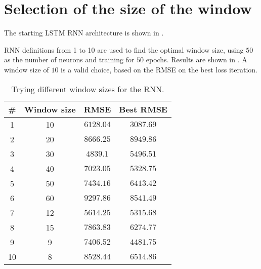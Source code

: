 \section{Selection of the size of the window}\label{sec:rnnwinsize}

The starting LSTM RNN architecture is shown in .



RNN definitions from 1 to 10 are used to find the optimal window size, using
\(50\) as the number of neurons and training for \(50\) epochs. Results are
shown in . A window size of \(10\) is a valid
choice, based on the RMSE on the best loss iteration.

\begin{table}[hbtp]
	\centering
	\begin{tabular}{|c|c|c|c|}
		\toprule
		\# & Window size & RMSE & Best RMSE \\
		\midrule
		1 & 10 & \(6128.04\) & \(3087.69\) \\
		2 & 20 & \(8666.25\) & \(8949.86\) \\
		3 & 30 & \(4839.1\) & \(5496.51\) \\
		4 & 40 & \(7023.05\) & \(5328.75\) \\
		5 & 50 & \(7434.16\) & \(6413.42\) \\
		6 & 60 & \(9297.86\) & \(8541.49\) \\
		7 & 12 & \(5614.25\) & \(5315.68\) \\
		8 & 15 & \(7863.83\) & \(6274.77\) \\
		9 & 9 & \(7406.52\) & \(4481.75\) \\
		10 & 8 & \(8528.44\) & \(6514.86\) \\
		\bottomrule
	\end{tabular}
	\caption{Trying different window sizes for the
	RNN.}\label{table:rnnwinsize}
\end{table}
